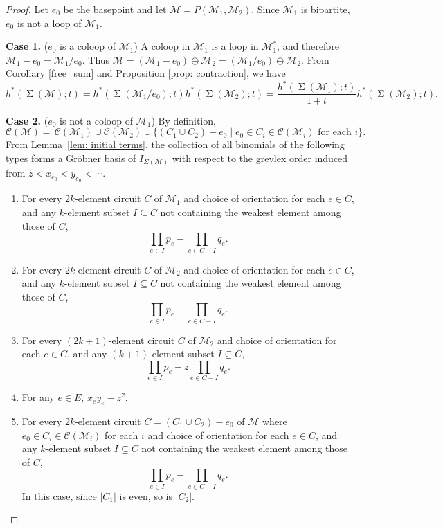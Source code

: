 \documentclass{amsart}
\numberwithin{equation}{section}
\theoremstyle{plain}
\theoremstyle{definition}
\newcommand{\calC}{\mathcal{C}}
\newcommand{\calM}{\mathcal{M}}
\DeclareMathOperator{\SEP}{\Sigma}
\begin{document}
\begin{proof}
Let $e_0$ be the basepoint and let $\calM = P(\calM_1,\calM_2)$.
Since $\calM_1$ is bipartite, $e_0$ is not a loop of $\calM_1$.


\bigskip

\noindent
{\bf Case 1.}
($e_0$ is a coloop of $\calM_1$)
A coloop in $\calM_1$ is a loop in $\calM_1^*$, and therefore $\calM_1 - e_0 = \calM_1 / e_0$. 
Thus
$\calM = (\calM_1-e_0) \oplus \calM_2=
(\calM_1/e_0) \oplus \calM_2$.
From Corollary \ref{free_sum} and Proposition \ref{prop: contraction},
we have 
\[
        h^*(\SEP(\calM);t) =
        h^*(\SEP(\calM_1/e_0);t)h^*(\SEP(\calM_2);t)
        =\frac{h^*(\SEP(\calM_1);t)}{1+t}h^*(\SEP(\calM_2);t).
      \]

\noindent
{\bf Case 2.}
($e_0$ is not a coloop of $\calM_1$)
By definition,
\[
    \calC(\calM) = \, \calC(\calM_1) \cup \calC(\calM_2) \cup \{(C_1 \cup C_2) - e_0 \mid e_0 \in C_i \in \calC(\calM_i) \text{ for each } i\}.
\]
From Lemma~\ref{lem: initial terms},
    the collection of all binomials of the following types forms a Gr\"obner basis of $I_{\Sigma(\calM)}$ with respect to the grevlex order induced from $z < x_{e_0} < y_{e_0} < \cdots$.
    \begin{enumerate}[label={\rm (\roman*)}]
        \item 
        For every $2k$-element circuit $C$ of $\calM_1$ and choice of orientation for each $e \in C$, and any $k$-element subset $I \subseteq C$ not containing the weakest element among those of $C$,
        \[
            \prod_{e \in I} p_e - \prod_{e \in C - I} q_e.
        \]
        \item 
        For every $2k$-element circuit $C$ of $\calM_2$ and choice of orientation for each $e \in C$, and any $k$-element subset $I \subseteq C$ not containing the weakest element among those of $C$,
        \[
            \prod_{e \in I} p_e - \prod_{e \in C - I} q_e.
        \]
        \item 
        For every $(2k+1)$-element circuit $C$ of $\calM_2$ and choice of orientation for each $e \in C$, and any $(k+1)$-element subset $I \subseteq C$,
        \[
            \prod_{e \in I} p_e - z\prod_{e \in C - I} q_e.
        \]
        \item 
        For any $e \in E$, $x_ey_e - z^2$.
        
        \item         
        For every $2k$-element circuit $C=(C_1 \cup C_2)-e_0$ of $\calM$ where 
        $e_0 \in C_i \in \calC(\calM_i)$ for each $i$
        and choice of orientation for each $e \in C$, and any $k$-element subset $I \subseteq C$ not containing the weakest element among those of $C$,
        \[
            \prod_{e \in I} p_e - \prod_{e \in C - I} q_e.
        \]
        In this case, since $|C_1|$ is even, so is $|C_2|$.


\end{enumerate}
\end{proof}
\end{document}
